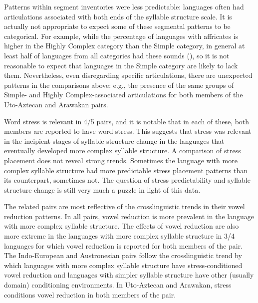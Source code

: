   Patterns within segment inventories were less predictable: languages often had articulations associated with both ends of the syllable structure scale. It is actually not appropriate to expect some of these segmental patterns to be categorical. For example, while the percentage of languages with affricates is higher in the Highly Complex category than the Simple category, in general at least half of languages from all categories had these sounds (), so it is not reasonable to expect that languages in the Simple category are likely to lack them. Nevertheless, even disregarding specific articulations, there are unexpected patterns in the comparisons above: e.g., the presence of the same groups of Simple- and Highly Complex-associated articulations for both members of the Uto-Aztecan and Arawakan pairs.



  Word stress is relevant in 4/5 pairs, and it is notable that in each of these, both members are reported to have word stress. This suggests that stress was relevant in the incipient stages of syllable structure change in the languages that eventually developed more complex syllable structure. A comparison of stress placement does not reveal strong trends. Sometimes the language with more complex syllable structure had more predictable stress placement patterns than its counterpart, sometimes not. The question of stress predictability and syllable structure change is still very much a puzzle in light of this data.



  The related pairs are most reflective of the crosslinguistic trends in their vowel reduction patterns. In all pairs, vowel reduction is more prevalent in the language with more complex syllable structure. The effects of vowel reduction are also more extreme in the languages with more complex syllable structure in 3/4 languages for which vowel reduction is reported for both members of the pair. The Indo-European and Austronesian pairs follow the crosslinguistic trend by which languages with more complex syllable structure have stress-conditioned vowel reduction and languages with simpler syllable structure have other (usually domain) conditioning environments. In Uto-Aztecan and Arawakan, stress conditions vowel reduction in both members of the pair.



